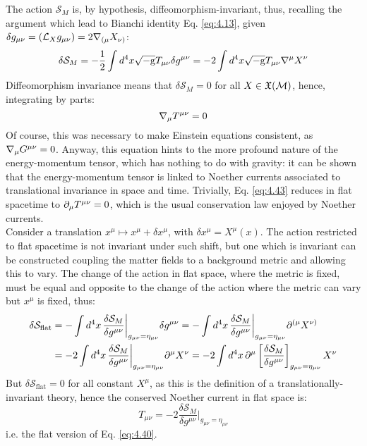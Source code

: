 The action $ \mathcal{S}_M $ is, by hypothesis, diffeomorphism-invariant, thus, recalling the argument which lead to Bianchi identity Eq. \ref{eq:4.13}, given $ \delta g_{\mu \nu} = (\mathcal{L}_X g_{\mu \nu}) = 2 \nabla_{(\mu} X_{\nu)} $:
\begin{equation*}
  \delta \mathcal{S}_M = - \frac{1}{2} \int d^4 x \sqrt{-\mathrm{g}} T_{\mu \nu} \delta g^{\mu \nu} = -2 \int d^4 x \sqrt{-\mathrm{g}} T_{\mu \nu} \nabla^\mu X^\nu
\end{equation*}
Diffeomorphism invariance means that $ \delta \mathcal{S}_M = 0 $ for all $ X \in \mathfrak{X}(\mathcal{M}) $, hence, integrating by parts:
\begin{equation}
  \nabla_\mu T^{\mu \nu} = 0
  \label{eq:4.43}
\end{equation}
Of course, this was necessary to make Einstein equations consistent, as $ \nabla_\mu G^{\mu \nu} = 0 $. Anyway, this equation hints to the more profound nature of the energy-momentum tensor, which has nothing to do with gravity: it can be shown that the energy-momentum tensor is linked to Noether currents associated to translational invariance in space and time. Trivially, Eq. \ref{eq:4.43} reduces in flat spacetime to $ \partial_\mu T^{\mu \nu} = 0 $, which is the usual conservation law enjoyed by Noether currents.\\
Consider a translation $ x^\mu \mapsto x^\mu + \delta x^\mu $, with $ \delta x^\mu = X^\mu(x) $. The action restricted to flat spacetime is not invariant under such shift, but one which is invariant can be constructed coupling the matter fields to a background metric and allowing this to vary. The change of the action in flat space, where the metric is fixed, must be equal and opposite to the change of the action where the metric can vary but $ x^\mu $ is fixed, thus:
\begin{equation*}
  \begin{split}
    \delta \mathcal{S}_{\text{flat}}
    &= - \int d^4 x\, \frac{\delta \mathcal{S}_M}{\delta g^{\mu \nu}} \bigg\vert_{g_{\mu \nu} = \eta_{\mu \nu}} \delta g^{\mu \nu} = - \int d^4 x\, \frac{\delta \mathcal{S}_M}{\delta g^{\mu \nu}} \bigg\vert_{g_{\mu \nu} = \eta_{\mu \nu}} \partial^{(\mu} X^{\nu)} \\
    &= - 2 \int d^4 x\, \frac{\delta \mathcal{S}_M}{\delta g^{\mu \nu}} \bigg\vert_{g_{\mu \nu} = \eta_{\mu \nu}} \partial^\mu X^\nu = - 2 \int d^4 x\, \partial^\mu \left[ \frac{\delta \mathcal{S}_M}{\delta g^{\mu \nu}} \right]_{g_{\mu \nu} = \eta_{\mu \nu}} X^\nu
  \end{split}
\end{equation*}
But $ \delta \mathcal{S}_{\text{flat}} = 0 $ for all constant $ X^\mu $, as this is the definition of a translationally-invariant theory, hence the conserved Noether current in flat space is:
\begin{equation*}
  T_{\mu \nu} = - 2 \frac{\delta \mathcal{S}_M}{\delta g^{\mu \nu}} \bigg\vert_{g_{\mu \nu} = \eta_{\mu \nu}}
\end{equation*}
i.e. the flat version of Eq. \ref{eq:4.40}.

